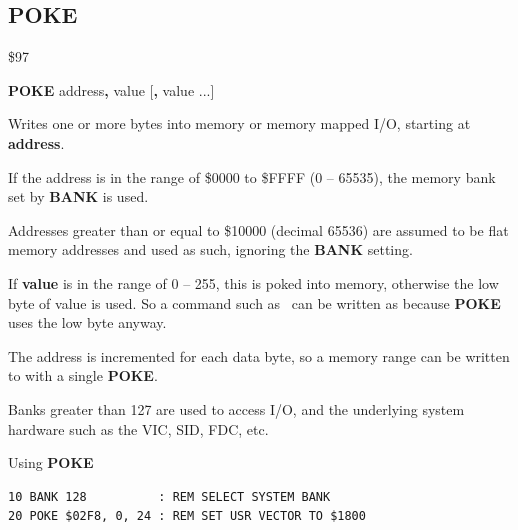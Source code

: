 
\newpage
\subsection{POKE}
\begin{description}[leftmargin=2cm,style=nextline]
\item [Token:]    \$97

\item [Format:]   {\bf POKE} address{\bf,} value [{\bf,} value ...]

\item [Returns:]  Writes one or more bytes into memory or memory mapped I/O, starting at {\bf address}.

                  If the address is in the range of \$0000 to \$FFFF (0 -- 65535), the memory bank set by {\bf BANK} is used.

                  Addresses greater than or equal to \$10000 (decimal 65536) are assumed to be flat memory addresses and used as such, ignoring the {\bf BANK} setting.

                  If {\bf value} is in the range of 0 -- 255, this is poked into memory, otherwise the low byte of value is used. So a command such as  can be written as  because {\bf POKE} uses the low byte anyway.

\item [Remarks:]  The address is incremented for each data byte, so a memory range can be written to with a single {\bf POKE}.

                  Banks greater than 127 are used to access I/O, and the underlying system hardware such as the VIC, SID, FDC, etc.

\item [Example:]  Using {\bf POKE}

\begin{tcolorbox}[colback=black,coltext=white]
\verbatimfont{\codefont}
\begin{verbatim}
10 BANK 128          : REM SELECT SYSTEM BANK
20 POKE $02F8, 0, 24 : REM SET USR VECTOR TO $1800
\end{verbatim}
\end{tcolorbox}
\end{description}


\newpage
